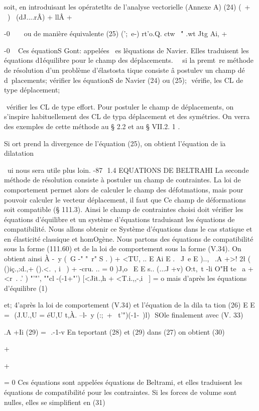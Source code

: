 {soit, en introduisant les opératetlts de l'analyse vectorielle (Annexe A) 
(24) (~+ ~) ~(dJ....rÂ) + llÂ + { -0
~ ~ 
ou de manière équivalente 
(25) (';\+~e-) rt'o.Q. ctw~ \'" .wt Jtg\; Ai, + { -0
~ 
Ces équationS Gont: appelées ~es lêquations de Navier. Elles traduisent les 
équations d1équilibre pour le champ des déplacements. 
~~si la premt~re méthode de résolution d'un problème d'élastosta­
tique consiste â 
postulev un champ dé d~placements; 
vérifier les équationS de Navier (24) ou (25); 
 
vérifie, les CL de type déplacement; 

 
vérifier les CL de type effort. 
Pour postuler le champ de déplacements, on s'inspire habituellement des CL 
de typa déplacement et des symétries. On verra des exemples de cette méthode 
au § 2.2 et au § VII.2. 1 . 



Si ort prend la divergence de l'équation (25), on obtient l'équation de ïa dilatation 

~ui nous sera utile plus loin. 
-87 ­
1.4 EQUATIONS DE BELTRAHI 
La seconde méthode de résolution consiste à postuler un champ de contraintes. La loi de comportement permet alors de calculer le champ des défotmations, mais pour pouvoir calculer le vecteur déplacement, il faut que Ce champ de déformations soit compatible (§ 111.3). Ainsi le champ de contraintes choisi doit vérifier les équations d'équilibre et un système d'équations traduisant les équations de compatibilité. Nous allons obtenir ce Système d'équations dans le cas statique et en élasticité classique et homOgène. 
Nous partons des équations de compatibilité sous la forme (111.60) et de la loi de comportement sous la forme (V.34). On obtient ainsi 
À -~y
(~G -" "~r" S . ) + <TU, ..
E Ai 
E .~ J~e E )..,~ 
.A +>! 2\l 
( ()iç.,:d.,+ ().<.~, i~ ) + -cru. .. = 0 
)J,o~
E E 
s..
(...J +v) O:t,~t -li O"H te ~a + <r~. .' 
) "'"', ""cl 
-(-1+"') [<Jit.,h + <T.i.,,-,i~ ] = o 
mais d'après les équations d'équilibre (1) 

et; 4'après la loi de comportement (V.34) et l'équation de la dila ta tion (26) 
E E 
= ­
(J.U.,U = éU,U t,À.
--l-~y (:;\ + ~t'")(-1-~)l) 

SOle finalement avec (V. 33) 

.A +Ii
(29) 
= ­
.-1-v 
En teportant (28) et (29) dans (27) on obtient 
(30) 

+ 

+ 

= 0 
Ces équations sont appelées équations de Beltrami, et elles traduisent les équations de compatibilité pour les contraintes. Si les forces de volume sont nulles, elles se simplifient en 
(31) 

}}}
